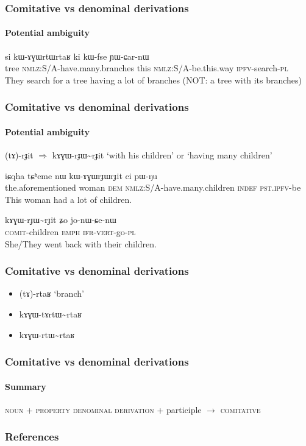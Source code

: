 \documentclass[xcolor=table]{beamer}
\newcommand{\ipa}[1]{{\phon \mbox{#1}}} %
\begin{document}
\begin{frame} 
\frametitle{Comitative vs denominal derivations} 
\framesubtitle{Potential ambiguity}  
\begin{exe}
\ex
\gll   
  \ipa{si} 	\ipa{kɯ-ɤɣɯrtɯrtaʁ} 	\ipa{ki} 	\ipa{kɯ-fse} 	\ipa{ɲɯ-ɕar-nɯ} \\
  tree \textsc{nmlz}:S/A-have.many.branches this \textsc{nmlz}:S/A-be.this.way \textsc{ipfv}-search-\textsc{pl} \\
\glt They search for a tree having a lot of branches (NOT: a tree with its branches)
\end{exe}
  \end{frame}    

\begin{frame} 
\frametitle{Comitative vs denominal derivations} 
\framesubtitle{Potential ambiguity}  
 \ipa{(tɤ)-rɟit} $\Rightarrow$ \ipa{kɤɣɯ-rɟɯ\textasciitilde{}rɟit} `with his children' or `having many children'
\begin{exe}
\ex
\gll   
\ipa{iɕqha} 	\ipa{tɕʰeme} 	\ipa{nɯ} 	\ipa{kɯ-ɤɣɯrɟɯrɟit} 	\ipa{ci} 	\ipa{pɯ-ŋu}  \\
the.aforementioned woman \textsc{dem} \textsc{nmlz}:S/A-have.many.children \textsc{indef} \textsc{pst.ipfv}-be \\
\glt This woman had a lot of children.
\end{exe}

\begin{exe}
\ex
\gll   
\ipa{kɤɣɯ-rɟɯ\textasciitilde{}rɟit} 	\ipa{ʑo} 	\ipa{jo-nɯ-ɕe-nɯ} \\
\textsc{comit}-children \textsc{emph} \textsc{ifr-vert}-go-\textsc{pl} \\
\glt She/They went back with their children.
\end{exe}
  \end{frame}    

     \begin{frame} 
\frametitle{Comitative vs denominal derivations} 
\begin{itemize}

\item  \ipa{(tɤ)-rtaʁ} `branch'
\item \ipa{kɤɣɯ-tɤrtɯ\textasciitilde{}rtaʁ}
\item  \ipa{kɤɣɯ-rtɯ\textasciitilde{}rtaʁ}

\end{itemize}
  \end{frame}    
  
     \begin{frame} 
\frametitle{Comitative vs denominal derivations} 
\framesubtitle{Summary}
 \begin{exe}
\ex
 \glt  \textsc{noun} + \textsc{property denominal derivation} + participle $\rightarrow$ \textsc{comitative}
\end{exe} 


 \end{frame}    
 
 
 \begin{frame} 
 \frametitle{References}
 \tiny
 

 \end{frame}
\end{document}

